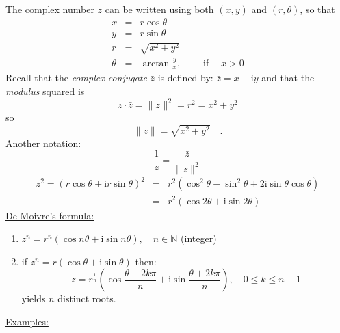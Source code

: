 \documentclass{article}
\newcommand{\mathi}{\mathrm{i}}
\newcommand{\mathpi}{\pi}
\newcommand{\nosymbol}{}
\newcommand{\tmem}[1]{{\em #1\/}}
\newcommand{\tmop}[1]{\ensuremath{\operatorname{#1}}}
\newenvironment{enumeratenumeric}{\begin{enumerate}[1.] }{\end{enumerate}}
\begin{document}
The complex number $z$ can be written using both $(x, y)$ and $(r, \theta)$,
so that
\begin{eqnarray*}
  x & = & r \cos \theta\\
  y & = & r \sin \theta\\
  r & = & \sqrt{x^2 + y^2}\\
  \theta & = & \arctan \frac{y}{x}, \qquad \tmop{if} \quad x > 0
\end{eqnarray*}
Recall that the {\tmem{complex conjugate}} $\bar{z}$ is defined by: $\bar{z} =
x - \mathi y$ and that the {\tmem{modulus}} squared is
\[ z \cdot \bar{z} = \| z^{\nosymbol} \|^2 = r^2 = x^2 + y^2 \]
so
\[ \| z \| = \sqrt{x^2 + y^2} \quad . \]
Another notation:
\[ \frac{1}{z} = \frac{\bar{z}}{\| z \|^2} \]
\begin{eqnarray*}
  z^2 = (r \cos \theta + \mathi r \sin \theta)^2 & = & r^2 (\cos^2 \theta -
  \sin^2 \theta + 2 \mathi \sin \theta \cos \theta)\\
  & = & r^2 (\cos 2 \theta + \mathi \sin 2 \theta)
\end{eqnarray*}
{\underline{De Moivre's formula:}}
\begin{enumeratenumeric}
  \item $z^n = r^n (\cos n \theta + \mathi \sin n \theta), \quad n \in
  \mathbb{N}$ (integer)
  
  \item  if $z^n = r (\cos \theta + \mathi \sin \theta)$ then:
  \[ z = r^{\frac{1}{n}} \left( \cos \frac{\theta + 2 k \mathpi}{n} + \mathi
     \sin \frac{\theta + 2 k \mathpi}{n} \right), \quad 0 \leq k \leq n - 1 \]
  yields $n$ distinct roots.
\end{enumeratenumeric}
{\underline{Examples:}}
\end{document}
